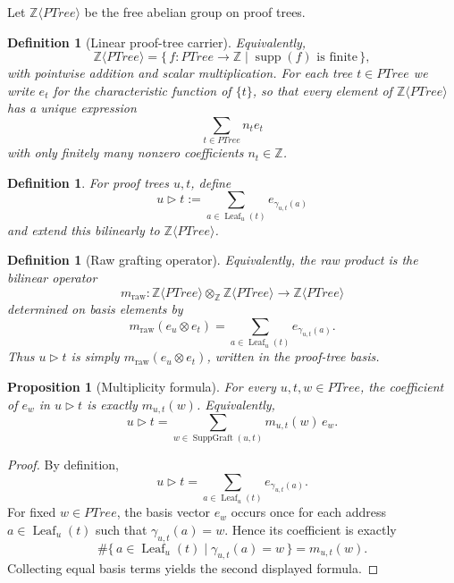 \documentclass[11pt]{article}
\newtheorem{proposition}[theorem]{Proposition}
\newtheorem{definition}[theorem]{Definition}
\newcommand{\PTree}{\mathit{PTree}}
\newcommand{\ZZ}{\mathbb{Z}}
\begin{document}
Let \(\ZZ\langle \PTree \rangle\) be the free abelian group on proof trees.

\begin{definition}[Linear proof-tree carrier]
Equivalently,
\[
\ZZ\langle \PTree \rangle
=
\{\,f:\PTree\to \ZZ \mid \operatorname{supp}(f)\text{ is finite}\,\},
\]
with pointwise addition and scalar multiplication. For each tree \(t\in\PTree\) we
write \(e_t\) for the characteristic function of \(\{t\}\), so that every
element of \(\ZZ\langle \PTree \rangle\) has a unique expression
\[
\sum_{t\in \PTree} n_t e_t
\]
with only finitely many nonzero coefficients \(n_t\in \ZZ\).
\end{definition}

\begin{definition}
For proof trees \(u,t\), define
\[
u \triangleright t := \sum_{a\in \operatorname{Leaf}_u(t)} e_{\gamma_{u,t}(a)}
\]
and extend this bilinearly to \(\ZZ\langle \PTree \rangle\).
\end{definition}

\begin{definition}[Raw grafting operator]
Equivalently, the raw product is the bilinear operator
\[
m_{\mathrm{raw}} :
\ZZ\langle \PTree\rangle \otimes_{\ZZ} \ZZ\langle \PTree\rangle
\longrightarrow
\ZZ\langle \PTree\rangle
\]
determined on basis elements by
\[
m_{\mathrm{raw}}(e_u\otimes e_t)
=
\sum_{a\in \operatorname{Leaf}_u(t)} e_{\gamma_{u,t}(a)}.
\]
Thus \(u\triangleright t\) is simply \(m_{\mathrm{raw}}(e_u\otimes e_t)\),
written in the proof-tree basis.
\end{definition}

\begin{proposition}[Multiplicity formula]
For every \(u,t,w\in \PTree\), the coefficient of \(e_w\) in
\(u\triangleright t\) is exactly \(m_{u,t}(w)\). Equivalently,
\[
u\triangleright t
=
\sum_{w\in \operatorname{SuppGraft}(u,t)} m_{u,t}(w)\,e_w.
\]
\end{proposition}

\begin{proof}
By definition,
\[
u\triangleright t=\sum_{a\in \operatorname{Leaf}_u(t)} e_{\gamma_{u,t}(a)}.
\]
For fixed \(w\in \PTree\), the basis vector \(e_w\) occurs once for each
address \(a\in \operatorname{Leaf}_u(t)\) such that \(\gamma_{u,t}(a)=w\).
Hence its coefficient is exactly
\[
\#\{\,a\in \operatorname{Leaf}_u(t)\mid \gamma_{u,t}(a)=w\,\}=m_{u,t}(w).
\]
Collecting equal basis terms yields the second displayed formula.
\end{proof}
\end{document}
